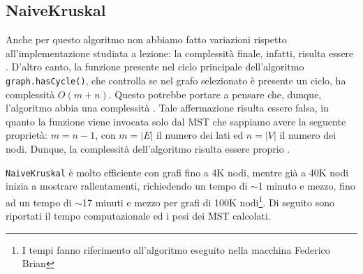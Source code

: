 \subsection{NaiveKruskal}
Anche per questo algoritmo non abbiamo fatto variazioni rispetto all'implementazione studiata a lezione: la complessità finale, infatti, risulta essere . D'altro canto, la funzione presente nel ciclo principale dell'algoritmo \texttt{graph.hasCycle()}, che controlla se nel grafo selezionato è presente un ciclo, ha complessità $O(m+n)$. Questo potrebbe portare a pensare che, dunque, l'algoritmo abbia una complessità . Tale affermazione risulta essere falsa, in quanto la funzione viene invocata solo dal MST che sappiamo avere la seguente proprietà: $m=n-1$, con $m = |E|$ il numero dei lati ed $n = |V|$ il numero dei nodi. Dunque, la complessità dell'algoritmo risulta essere proprio .


\texttt{NaiveKruskal} è molto efficiente con grafi fino a 4K nodi, mentre già a 40K nodi inizia a mostrare rallentamenti, richiedendo un tempo di $\sim$1 minuto e mezzo, fino ad un tempo di $\sim$17 minuti e mezzo per grafi di 100K nodi\footnote{I tempi fanno riferimento all'algoritmo eseguito nella macchina Federico Brian}. Di seguito sono riportati il tempo computazionale ed i pesi dei MST calcolati.

